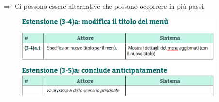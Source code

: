 \begin{itemize}
\begin{figure}[!h]
\end{figure}
\item [$\Rightarrow$] Ci possono essere alternative che possono occorrere in più passi.
\begin{figure}[!h]
    \centering
    \includegraphics[scale = 0.55]{images/Estensione3.png}
\end{figure}
\end{itemize}


